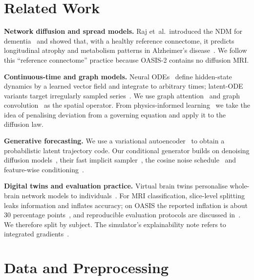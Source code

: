 \documentclass[conference]{IEEEtran}
\begin{document}
\section{Related Work}
\textbf{Network diffusion and spread models.} Raj et~al.\ introduced the NDM for dementia~\cite{raj2012ndm} and showed that, with a healthy reference connectome, it predicts longitudinal atrophy and metabolism patterns in Alzheimer's disease~\cite{raj2015ndm}. We follow this ``reference connectome'' practice because OASIS-2 contains no diffusion MRI.

\textbf{Continuous-time and graph models.} Neural ODEs~\cite{chen2018neuralode} define hidden-state dynamics by a learned vector field and integrate to arbitrary times; latent-ODE variants target irregularly sampled series~\cite{rubanova2019latentode}. We use graph attention~\cite{velickovic2018gat} and graph convolution~\cite{kipf2017gcn} as the spatial operator. From physics-informed learning~\cite{raissi2019pinn} we take the idea of penalising deviation from a governing equation and apply it to the diffusion law.

\textbf{Generative forecasting.} We use a variational autoencoder~\cite{kingma2014vae} to obtain a probabilistic latent trajectory code. Our conditional generator builds on denoising diffusion models~\cite{ho2020ddpm}, their fast implicit sampler~\cite{song2021ddim}, the cosine noise schedule~\cite{nichol2021improved} and feature-wise conditioning~\cite{perez2018film}.

\textbf{Digital twins and evaluation practice.} Virtual brain twins personalise whole-brain network models to individuals~\cite{wang2024vbt}. For MRI classification, slice-level splitting leaks information and inflates accuracy; on OASIS the reported inflation is about 30 percentage points~\cite{yagis2021leakage}, and reproducible evaluation protocols are discussed in~\cite{wen2020cnn}. We therefore split by subject. The simulator's explainability note refers to integrated gradients~\cite{sundararajan2017ig}.

\section{Data and Preprocessing}\label{sec:data}
\end{document}
